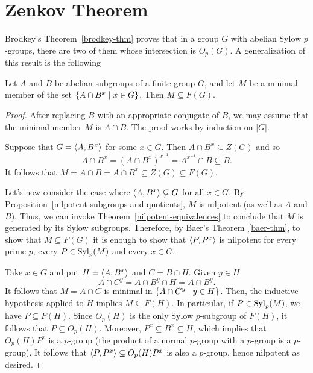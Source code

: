 \section{Zenkov Theorem}

Brodkey's Theorem~\ref{brodkey-thm} proves that in a group $G$ with abelian Sylow $p$-groups, there are two of them whose intersection is $O_p(G)$. A generalization of this result is the following

\begin{thm}\label{zenkov}
    {\upshape[Zenkov]} Let\/ $A$ and\/ $B$ be abelian subgroups of a finite group\/ $G$, and let\/ $M$ be a minimal member of the set\/ $\{A \cap B^x \mid x \in G\}$. Then\/ $M\subseteq F(G)$.
\end{thm}

\begin{proof} After replacing $B$ with an appropriate conjugate of $B$, we may assume that the minimal member $M$ is $A\cap B$. The proof works by induction on $|G|$.

Suppose that $G=\langle A,B^x\rangle$ for some $x\in G$. Then $A\cap B^x\subseteq Z(G)$ and so
$$
    A\cap B^x=(A\cap B^x)^{x^{-1}}=A^{x^{-1}}\!\!\cap B\subseteq B.
$$
It follows that $M=A\cap B = A\cap B^x\subseteq Z(G)\subseteq F(G)$.

Let's now consider the case where $\langle A,B^x\rangle\varsubsetneq G$ for all $x\in G$. By Proposition~\ref{nilpotent-subgroups-and-quotients}, $M$ is nilpotent (as well as $A$ and $B$). Thus, we can invoke Theorem~\ref{nilpotent-equivalences} to conclude that $M$ is generated by its Sylow subgroups. Therefore, by Baer's Theorem~\ref{baer-thm}, to show that $M\subseteq F(G)$ it is enough to show that $\langle P,P^x\rangle$ is nilpotent for every prime $p$, every $P\in{\rm Syl}_p(M)$ and every $x\in G$.

Take $x\in G$ and put $H=\langle A,B^x\rangle$ and $C=B\cap H$. Given $y\in H$
$$
    A\cap C^y = A\cap B^y\cap H= A\cap B^y.
$$
It follows that $M=A\cap C$ is minimal in $\{A\cap C^y\mid y\in H\}$. Then, the inductive hypothesis applied to $H$ implies $M\subseteq F(H)$. In particular, if $P\in{\rm Syl}_p(M)$, we have $P\subseteq F(H)$. Since $O_p(H)$ is the only Sylow $p$-subgroup of $F(H)$, it follows that $P\subseteq O_p(H)$. Moreover, $P^x\subseteq B^x\subseteq H$, which implies that $O_p(H)P^x$ is a $p$-group (the product of a normal $p$-group with a $p$-group is a $p$-group). It follows that $\langle P,P^x\rangle\subseteq O_p(H)P^x$ is also a $p$-group, hence nilpotent as desired.  \end{proof}

